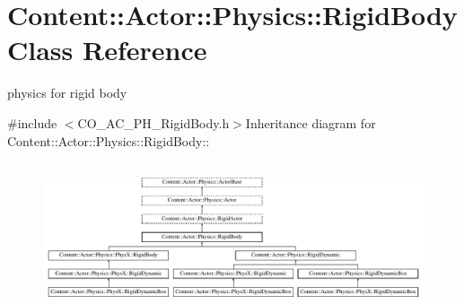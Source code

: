 \hypertarget{classContent_1_1Actor_1_1Physics_1_1RigidBody}{
\section{Content::Actor::Physics::RigidBody Class Reference}
\label{classContent_1_1Actor_1_1Physics_1_1RigidBody}
}


physics for rigid body  


{\ttfamily \#include $<$CO\_\-AC\_\-PH\_\-RigidBody.h$>$}Inheritance diagram for Content::Actor::Physics::RigidBody::\begin{figure}[H]
\begin{center}
\leavevmode
\includegraphics[height=4.39955cm]{classContent_1_1Actor_1_1Physics_1_1RigidBody}
\end{center}
\end{figure}

